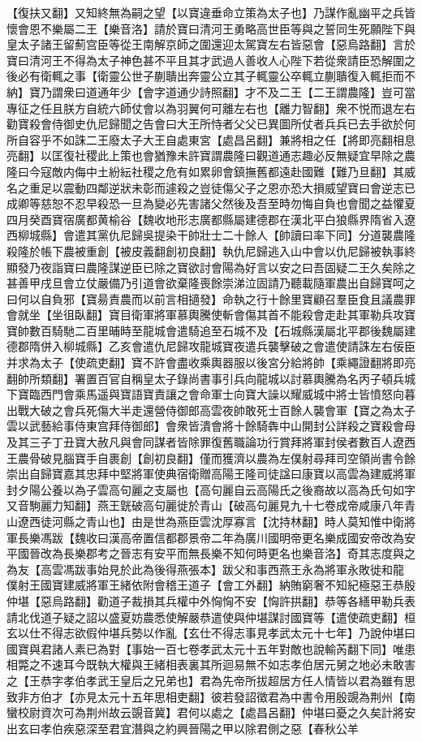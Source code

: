 【復扶又翻】又知終無為嗣之望【以寶違垂命立策為太子也】乃謀作亂幽平之兵皆懷會恩不樂屬二王【樂音洛】請於寶曰清河王勇略高世臣等與之誓同生死願陛下與皇太子諸王留薊宫臣等從王南解京師之圍還迎太駕寶左右皆惡會【惡烏路翻】言於寶曰清河王不得為太子神色甚不平且其才武過人善收人心陛下若從衆請臣恐解圍之後必有衛輒之事【衛靈公世子蒯聵出奔靈公立其子輒靈公卒輒立蒯聵復入輒拒而不納】寶乃謂衆曰道通年少【會字道通少詩照翻】才不及二王【二王謂農隆】豈可當專征之任且朕方自統六師仗會以為羽翼何可離左右也【離力智翻】衆不悦而退左右勸寶殺會侍御史仇尼歸聞之告會曰大王所恃者父父已異圖所仗者兵兵已去手欲於何所自容乎不如誅二王廢太子大王自處東宮【處昌呂翻】兼將相之任【將即亮翻相息亮翻】以匡復社稷此上策也會猶豫未許寶謂農隆曰觀道通志趣必反無疑宜早除之農隆曰今寇敵内侮中土紛紜社稷之危有如累卵會鎮撫舊都遠赴國難【難乃旦翻】其威名之重足以震動四鄰逆狀未彰而遽殺之豈徒傷父子之恩亦恐大損威望寶曰會逆志已成卿等慈恕不忍早殺恐一旦為變必先害諸父然後及吾至時勿悔自負也會聞之益懼夏四月癸酉寶宿廣都黄榆谷【魏收地形志廣都縣屬建德郡在漢北平白狼縣界隋省入遼西柳城縣】會遣其黨仇尼歸吳提染干帥壯士二十餘人【帥讀曰率下同】分道襲農隆殺隆於帳下農被重創【被皮義翻創初良翻】執仇尼歸逃入山中會以仇尼歸被執事終顯發乃夜詣寶曰農隆謀逆臣已除之寶欲討會陽為好言以安之曰吾固疑二王久矣除之甚善甲戌旦會立仗嚴備乃引道會欲棄隆喪餘崇涕泣固請乃聽載隨軍農出自歸寶呵之曰何以自負邪【寶昜責農而以前言相擿發】命執之行十餘里寶顧召羣臣食且議農罪會就坐【坐徂臥翻】寶目衛軍將軍慕輿騰使斬會傷其首不能殺會走赴其軍勒兵攻寶寶帥數百騎馳二百里晡時至龍城會遣騎追至石城不及【石城縣漢屬北平郡後魏屬建德郡隋併入柳城縣】乙亥會遣仇尼歸攻龍城寶夜遣兵襲擊破之會遣使請誅左右佞臣并求為太子【使疏吏翻】寶不許會盡收乘輿器服以後宮分給將帥【乘繩證翻將即亮翻帥所類翻】署置百官自稱皇太子錄尚書事引兵向龍城以討慕輿騰為名丙子頓兵城下寶臨西門會乘馬遥與寶語寶責讓之會命軍士向寶大譟以耀威城中將士皆憤怒向暮出戰大破之會兵死傷大半走還營侍御郎高雲夜帥敢死士百餘人襲會軍【寶之為太子雲以武藝給事侍東宫拜侍御郎】會衆皆潰會將十餘騎犇中山開封公詳殺之寶殺會母及其三子丁丑寶大赦凡與會同謀者皆除罪復舊職論功行賞拜將軍封侯者數百人遼西王農骨破見腦寶手自裹創【創初良翻】僅而獲濟以農為左僕射尋拜司空領尚書令餘崇出自歸寶嘉其忠拜中堅將軍使典宿衛贈高陽王隆司徒諡曰康寶以高雲為建威將軍封夕陽公養以為子雲高句麗之支屬也【高句麗自云高陽氏之後裔故以高為氏句如字又音駒麗力知翻】燕王皝破高句麗徙於青山【破高句麗見九十七卷成帝咸康八年青山遼西徒河縣之青山也】由是世為燕臣雲沈厚寡言【沈持林翻】時人莫知惟中衛將軍長樂馮跋【魏收曰漢高帝置信都郡景帝二年為廣川國明帝更名樂成國安帝改為安平國晉改為長樂郡考之晉志有安平而無長樂不知何時更名也樂音洛】奇其志度與之為友【高雲馮跋事始見於此為後得燕張本】跋父和事西燕王永為將軍永敗徙和龍　僕射王國寶建威將軍王緒依附會稽王道子【會工外翻】納賄窮奢不知紀極惡王恭殷仲堪【惡烏路翻】勸道子裁損其兵權中外恟恟不安【恟許拱翻】恭等各繕甲勒兵表請北伐道子疑之詔以盛夏妨農悉使解嚴恭遣使與仲堪謀討國寶等【遣使疏吏翻】桓玄以仕不得志欲假仲堪兵勢以作亂【玄仕不得志事見孝武太元十七年】乃說仲堪曰國寶與君諸人素已為對【事始一百七卷孝武太元十五年對敵也說輸芮翻下同】唯患相斃之不速耳今既執大權與王緒相表裏其所迴易無不如志孝伯居元舅之地必未敢害之【王恭字孝伯孝武王皇后之兄弟也】君為先帝所拔超居方任人情皆以君為雖有思致非方伯才【亦見太元十五年思相吏翻】彼若發詔徵君為中書令用殷覬為荆州【南蠻校尉資次可為荆州故云覬音冀】君何以處之【處昌呂翻】仲堪曰憂之久矣計將安出玄曰孝伯疾惡深至君宜潛與之約興晉陽之甲以除君側之惡【春秋公羊